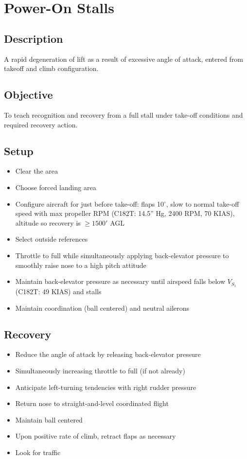 \section{Power-On Stalls}

\subsection{Description}

A rapid degeneration of lift as a result of excessive angle of attack, entered
from takeoff and climb configuration.

\subsection{Objective}

To teach recognition and recovery from a full stall under take-off conditions
and required recovery action.

\subsection{Setup}

\begin{itemize}
  \item Clear the area
  \item Choose forced landing area
  \item Configure aircraft for just before take-off: flaps 10$^\circ$, slow to
    normal take-off speed with max propeller RPM (C182T: 14.5'' Hg, 2400 RPM, 70
    KIAS), altitude so recovery is $\geq 1500'$ AGL
  \item Select outside references
  \item Throttle to full while simultaneously applying back-elevator pressure
    to smoothly raise nose to a high pitch attitude
  \item Maintain back-elevator pressure as necessary until airspeed falls
    below $V_{S_1}$ (C182T: 49 KIAS) and stalls
  \item Maintain coordination (ball centered) and neutral ailerons
\end{itemize}

\subsection{Recovery}

\begin{itemize}
  \item Reduce the angle of attack by releasing back-elevator pressure
  \item Simultaneously increasing throttle to full (if not already)
  \item Anticipate left-turning tendencies with right rudder pressure
  \item Return nose to straight-and-level coordinated flight 
  \item Maintain ball centered
  \item Upon positive rate of climb, retract flaps as necessary 
  \item Look for traffic
\end{itemize}

